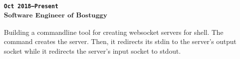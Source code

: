 \subsubsection{\textsubscript{\uppercase{\texttt{Oct 2018--Present}}\\
Software Engineer of Bostuggy
}
}
Building a commandline tool for creating websocket servers for shell.
The command creates the server.
Then, it redirects its stdin to the server's output socket while it redirects the server's input socket to stdout.
